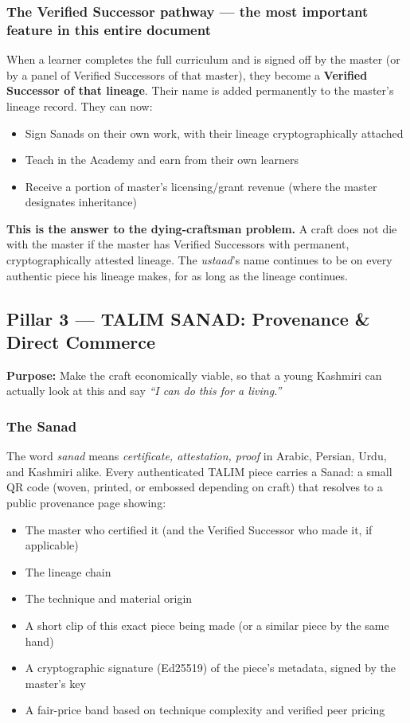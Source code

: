 \documentclass[11pt, a4paper]{article}
\begin{document}
\subsubsection{The Verified Successor pathway — the most important feature in this entire document}

When a learner completes the full curriculum and is signed off by the master (or by a panel of Verified Successors of that master), they become a \textbf{Verified Successor of that lineage}. Their name is added permanently to the master's lineage record. They can now:

\begin{itemize}
  \item Sign Sanads on their own work, with their lineage cryptographically attached
  \item Teach in the Academy and earn from their own learners
  \item Receive a portion of master's licensing/grant revenue (where the master designates inheritance)
\end{itemize}

\textbf{This is the answer to the dying-craftsman problem.} A craft does not die with the master if the master has Verified Successors with permanent, cryptographically attested lineage. The {\itshape ustaad}'s name continues to be on every authentic piece his lineage makes, for as long as the lineage continues.

\subsection{Pillar 3 — TALIM SANAD: Provenance \& Direct Commerce}

\textbf{Purpose:} Make the craft economically viable, so that a young Kashmiri can actually look at this and say {\itshape ``I can do this for a living.''}

\subsubsection{The Sanad}

The word {\itshape sanad} means {\itshape certificate, attestation, proof} in Arabic, Persian, Urdu, and Kashmiri alike. Every authenticated TALIM piece carries a Sanad: a small QR code (woven, printed, or embossed depending on craft) that resolves to a public provenance page showing:

\begin{itemize}
  \item The master who certified it (and the Verified Successor who made it, if applicable)
  \item The lineage chain
  \item The technique and material origin
  \item A short clip of this exact piece being made (or a similar piece by the same hand)
  \item A cryptographic signature (Ed25519) of the piece's metadata, signed by the master's key
  \item A fair-price band based on technique complexity and verified peer pricing
\end{itemize}
\end{document}
